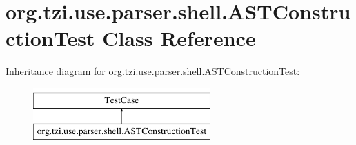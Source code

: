 \hypertarget{classorg_1_1tzi_1_1use_1_1parser_1_1shell_1_1_a_s_t_construction_test}{\section{org.\-tzi.\-use.\-parser.\-shell.\-A\-S\-T\-Construction\-Test Class Reference}
\label{classorg_1_1tzi_1_1use_1_1parser_1_1shell_1_1_a_s_t_construction_test}
}
Inheritance diagram for org.\-tzi.\-use.\-parser.\-shell.\-A\-S\-T\-Construction\-Test\-:\begin{figure}[H]
\begin{center}
\leavevmode
\includegraphics[height=2.000000cm]{classorg_1_1tzi_1_1use_1_1parser_1_1shell_1_1_a_s_t_construction_test}
\end{center}
\end{figure}
